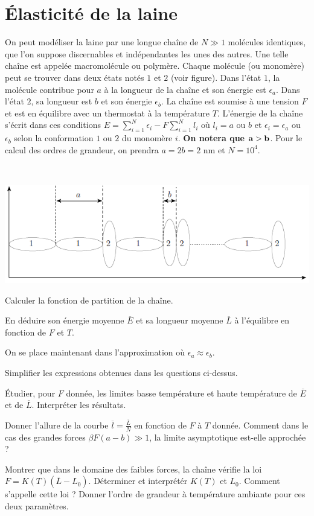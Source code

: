 \documentclass[utf8, 11pt]{feuille}
\begin{document}
\section{ Élasticité de la laine}
On peut modéliser la laine par une longue chaîne de $N \gg 1$ molécules identiques, que l'on suppose discernables et indépendantes les unes des autres. Une telle chaîne est appelée macromolécule ou polymère. Chaque molécule (ou monomère) peut se trouver
dans deux états notés $1$ et $2$ (voir figure). Dans l’état $1$, la molécule contribue pour $a$ à la longueur de la
chaîne et son énergie est $\epsilon_{a}$. Dans l’état $2$, sa longueur est $b$ et son énergie $\epsilon_{b}$. La chaîne est
soumise à une tension $F$ et est en équilibre avec un thermostat à la température $T$. L'énergie de la chaîne s'écrit dans ces conditions $E=\sum_{i=1}^{N} \epsilon_i-F\sum_{i=1}^{N} l_i$ où $l_i=a$ ou $b$ et $\epsilon_i=\epsilon_{a}$ ou $\epsilon_{b}$ selon la conformation $1$ ou $2$ du monomère $i$. {\bf On notera que $\bf a > b$}. Pour le calcul des ordres de
grandeur, on prendra $a = 2b = 2$ nm et $N = 10^4$.

\ 

\centerline{\includegraphics[height=.17\textwidth]{keratine.png}}

\question Calculer la fonction de partition de la chaîne. 

\question En déduire son énergie moyenne $\overline{E}$ et sa longueur moyenne $\overline{L}$ à l'équilibre en fonction de $F$ et $T$.

On se place maintenant dans l'approximation où $\epsilon_{a} \approx \epsilon_{b}$.

\question Simplifier les expressions obtenues dans les questions ci-dessus.

\question \'Etudier, pour $F$ donnée, les limites basse température et haute température  de $\overline{E}$ et de $\overline{L}$. Interpréter les résultats.

\question Donner l'allure de la courbe $\overline{l}=\frac{\overline{L}}{N}$ en fonction de $F$ à $T$ donnée. Comment dans le cas des grandes forces $\beta F (a-b) \gg 1$, la limite asymptotique est-elle approchée ?

\question Montrer que dans le domaine des faibles forces, la chaîne vérifie la loi $F=K(T) (\overline{L} - L_0)$. Déterminer et interprétér $K(T)$ et $L_0$. Comment s'appelle cette loi ? Donner l'ordre de grandeur à température ambiante pour ces deux paramètres.
\end{document}
